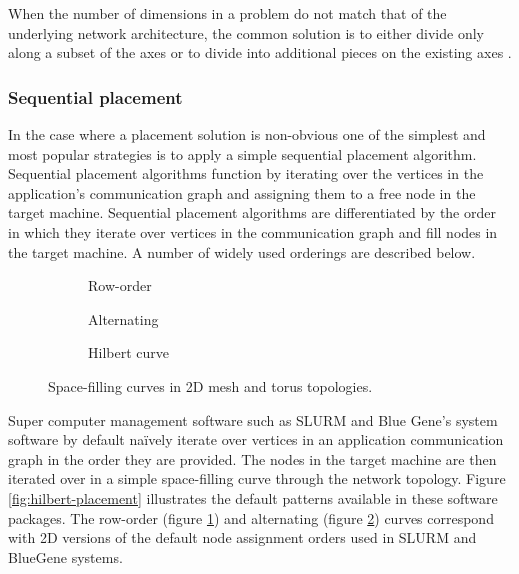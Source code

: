 				When the number of dimensions in a problem do not match that of the
				underlying network architecture, the common solution is to either
				divide only along a subset of the axes or to divide into additional
				pieces on the existing axes \cite{gilge14}.
			
			\subsubsection{Sequential placement}
				
				In the case where a placement solution is non-obvious one of the
				simplest and most popular strategies is to apply a simple sequential
				placement algorithm. Sequential placement algorithms function by
				iterating over the vertices in the application's communication graph
				and assigning them to a free node in the target machine. Sequential
				placement algorithms are differentiated by the order in which they
				iterate over vertices in the communication graph and fill nodes in the
				target machine. A number of widely used orderings are described below.
				
				\begin{figure}
					\center
					\begin{subfigure}{0.32\linewidth}
						\center
						\caption{Row-order}
						\label{fig:sequential-row-order}
					\end{subfigure}
					\begin{subfigure}{0.32\linewidth}
						\center
						\caption{Alternating}
						\label{fig:sequential-alternating}
					\end{subfigure}
					\begin{subfigure}{0.32\linewidth}
						\center
						\caption{Hilbert curve}
						\label{fig:sequential-hilbert}
					\end{subfigure}
					
					\caption{Space-filling curves in 2D mesh and torus topologies.}
					\label{fig:sequential}
				\end{figure}
				
				Super computer management software such as SLURM \cite{yoo03} and Blue
				Gene's system software \cite{gilge14} by default na\"ively iterate over
				vertices in an application communication graph in the order they are
				provided. The nodes in the target machine are then iterated over in a
				simple space-filling curve through the network topology. Figure
				\ref{fig:hilbert-placement} illustrates the default patterns available
				in these software packages. The row-order (figure
				\ref{fig:sequential-row-order}) and alternating (figure
				\ref{fig:sequential-alternating}) curves correspond with 2D versions of
				the default node assignment orders used in SLURM and BlueGene systems.
				
